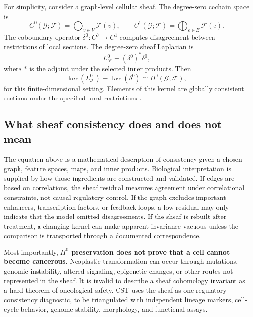 \documentclass[11pt,a4paper]{article}
\theoremstyle{definition}
\theoremstyle{remark}
\newcommand{\G}{\mathcal{G}}
\newcommand{\Fsh}{\mathcal{F}}
\begin{document}
For simplicity, consider a graph-level cellular sheaf. The degree-zero cochain space is
\begin{equation}
C^0(\G;\Fsh)=\bigoplus_{v\in V}\Fsh(v),\qquad
C^1(\G;\Fsh)=\bigoplus_{e\in E}\Fsh(e).
\end{equation}
The coboundary operator $\delta^0:C^0\rightarrow C^1$ computes disagreement between restrictions of local sections. The degree-zero sheaf Laplacian is
\begin{equation}
L_{\Fsh}^{0}=(\delta^0)^*\delta^0,
\label{eq:sheaf_laplacian}
\end{equation}
where $*$ is the adjoint under the selected inner products. Then
\begin{equation}
\ker(L_{\Fsh}^{0})=\ker(\delta^0)\cong H^0(\G;\Fsh),
\label{eq:H0}
\end{equation}
for this finite-dimensional setting. Elements of this kernel are globally consistent sections under the specified local restrictions \cite{HansenGhrist2019}.

\subsection{What sheaf consistency does and does not mean}
The equation above is a mathematical description of consistency given a chosen graph, feature spaces, maps, and inner products. Biological interpretation is supplied by how those ingredients are constructed and validated. If edges are based on correlations, the sheaf residual measures agreement under correlational constraints, not causal regulatory control. If the graph excludes important enhancers, transcription factors, or feedback loops, a low residual may only indicate that the model omitted disagreements. If the sheaf is rebuilt after treatment, a changing kernel can make apparent invariance vacuous unless the comparison is transported through a documented correspondence.

Most importantly, \textbf{$H^0$ preservation does not prove that a cell cannot become cancerous}. Neoplastic transformation can occur through mutations, genomic instability, altered signaling, epigenetic changes, or other routes not represented in the sheaf. It is invalid to describe a sheaf cohomology invariant as a hard theorem of oncological safety. CST uses the sheaf as one regulatory-consistency diagnostic, to be triangulated with independent lineage markers, cell-cycle behavior, genome stability, morphology, and functional assays.
\end{document}
